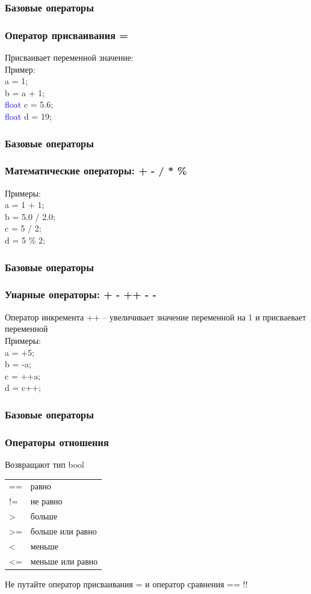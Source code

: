\documentclass[14pt,pdf,hyperref={unicode}]{beamer}
\begin{document}
\begin{frame}
\frametitle{Базовые операторы}
\frametitle{Оператор присваивания =} 
Присваивает переменной значение:\\
Пример:\\
\quad a = 1;\\
\quad b = a + 1;\\
\quad \textcolor{blue}{float} c = 5.6;\\
\quad \textcolor{blue}{float} d = 19;\\

\end{frame}


\begin{frame}
\frametitle{Базовые операторы}
\frametitle{Математические операторы: + - / * \%} 
Примеры:\\
\quad a = 1 + 1; \\
\quad b = 5.0 / 2.0;\\
\quad c = 5 / 2;\\
\quad d = 5 \% 2;\\
\end{frame}

\begin{frame}
\frametitle{Базовые операторы}
\frametitle{Унарные операторы: + - ++ - -}
Оператор инкремента ++ -- увеличивает значение переменной на 1 и присваевает переменной  \\
Примеры:\\
\quad a = +5; \\
\quad b = -a;\\
\quad c = ++a;\\
\quad d = c++;\\
\end{frame}

\begin{frame}
\frametitle{Базовые операторы}
\frametitle{Операторы отношения}
Возвращают тип bool
\begin{center}
\begin{tabular}{ l l}
  == & равно \\
  != & не равно \\
  > & больше \\
  >= & больше или равно \\
  < & меньше \\
  <= & меньше или равно \\
\end{tabular}
\end{center}

Не путайте оператор присваивания = и оператор сравнения == !! 
\end{frame}
\end{document}
